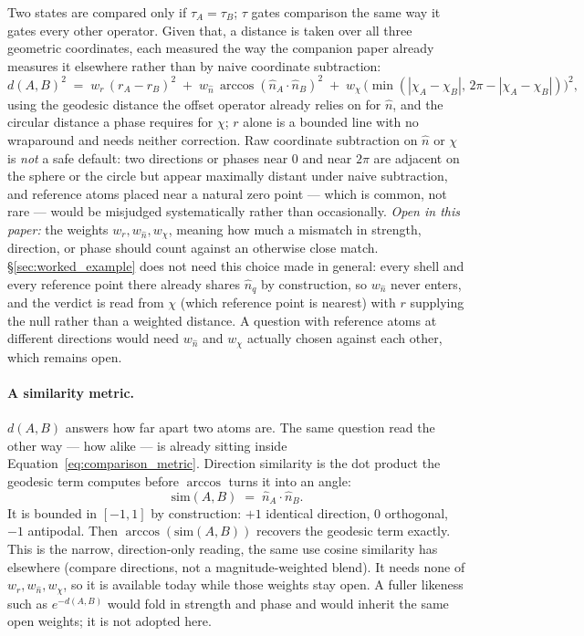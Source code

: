 \documentclass[12pt, a4paper]{article}
\begin{document}
Two states are compared only if $\tau_A=\tau_B$; $\tau$ gates
comparison the same way it gates every other operator. Given that, a
distance is taken over all three geometric coordinates, each measured
the way the companion paper already measures it elsewhere rather than
by naive coordinate subtraction:
\begin{equation}
    d(A,B)^2 \;=\;
    w_r\,(r_A-r_B)^2
    \;+\;
    w_{\hat n}\,\arccos(\hat n_A\cdot\hat n_B)^2
    \;+\;
    w_\chi\,\bigl(\min(|\chi_A-\chi_B|,\,2\pi-|\chi_A-\chi_B|)\bigr)^2 ,
    \label{eq:comparison_metric}
\end{equation}
using the geodesic distance the offset operator already relies on for
$\hat n$, and the circular distance a phase requires for $\chi$; $r$
alone is a bounded line with no wraparound and needs neither
correction. Raw coordinate subtraction on $\hat n$ or $\chi$ is
\emph{not} a safe default: two directions or phases near $0$ and near
$2\pi$ are adjacent on the sphere or the circle but appear maximally
distant under naive subtraction, and reference atoms placed near a
natural zero point --- which is common, not rare --- would be
misjudged systematically rather than occasionally. \emph{Open in this
paper:} the weights $w_r,w_{\hat n},w_\chi$, meaning how much a
mismatch in strength, direction, or phase should count against an
otherwise close match. \S\ref{sec:worked_example} does not need this
choice made in general: every shell and every reference point there
already shares $\hat n_q$ by construction, so $w_{\hat n}$ never
enters, and the verdict is read from $\chi$ (which reference point is
nearest) with $r$ supplying the null rather than a weighted distance.
A question with reference atoms at different directions would need
$w_{\hat n}$ and $w_\chi$ actually chosen against each other, which
remains open.

\paragraph{A similarity metric.}
$d(A,B)$ answers how far apart two atoms are. The same question
read the other way --- how alike --- is already sitting inside
Equation~\eqref{eq:comparison_metric}. Direction similarity is the
dot product the geodesic term computes before $\arccos$ turns it
into an angle:
\begin{equation}
    \mathrm{sim}(A,B) \;=\; \hat n_A\cdot\hat n_B.
    \label{eq:direction_similarity}
\end{equation}
It is bounded in $[-1,1]$ by construction: $+1$ identical
direction, $0$ orthogonal, $-1$ antipodal. Then
$\arccos(\mathrm{sim}(A,B))$ recovers the geodesic term exactly.
This is the narrow, direction-only reading, the same use cosine
similarity has elsewhere (compare directions, not a
magnitude-weighted blend). It needs none of
$w_r,w_{\hat n},w_\chi$, so it is available today while those
weights stay open. A fuller likeness such as $e^{-d(A,B)}$ would
fold in strength and phase and would inherit the same open
weights; it is not adopted here.
\end{document}
